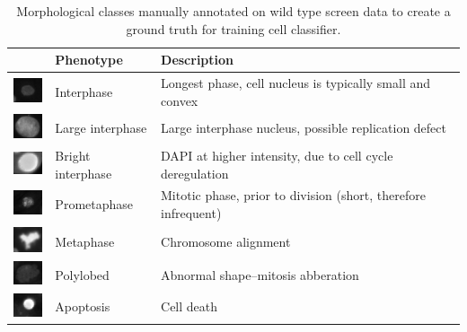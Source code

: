 \begin{table}[h!]
\begin{center}
\begin{tabular}{|l|l|p{7cm}|}
\hline
 & Phenotype & Description \\
\hline
\includegraphics[width=1cm]{img/cell_states_interphase.png} & Interphase & Longest phase, cell nucleus is typically small and convex \\
\hline
\includegraphics[width=1cm]{img/cell_states_large.png} & Large interphase & Large interphase nucleus, possible replication defect \\
\hline
\includegraphics[width=1cm]{img/cell_states_bright.png} & Bright interphase & DAPI at higher intensity, due to cell cycle deregulation \\
\hline
\includegraphics[width=1cm]{img/cell_states_prometaphase.png} & Prometaphase & Mitotic phase, prior to division (short, therefore infrequent) \\
\hline
\includegraphics[width=1cm]{img/cell_states_metaphase.png} & Metaphase & Chromosome alignment \\
\hline
\includegraphics[width=1cm]{img/cell_states_polylobed.png} & Polylobed & Abnormal shape--mitosis abberation \\
\hline
\includegraphics[width=1cm]{img/cell_states_apoptosis.png} & Apoptosis & Cell death \\
\hline
\end{tabular}
\caption{Morphological classes manually annotated on wild type screen data to create a ground truth for training cell classifier.}
\label{table:cell_states}
\end{center}
\end{table}

